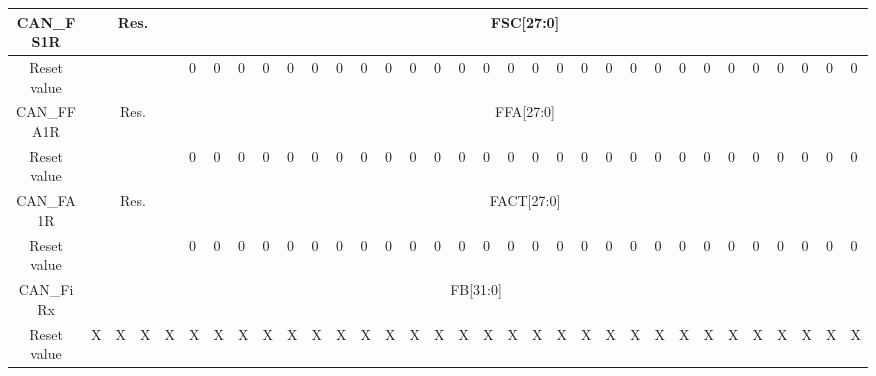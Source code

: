 \begin{table}[H]
{\begin{tabular}{|c|c|l|l|l|l|l|l|l|l|l|l|l|l|l|l|l|l|l|l|l|l|l|l|l|l|l|l|l|l|l|l|l|}
		\hline
		CAN\_FS1R & \multicolumn{4}{c|}{Res.} & \multicolumn{28}{c|}{FSC[27:0]} \\
		\hline
		Reset value & & & & & 0 & 0 & 0 & 0 & 0 & 0 & 0 & 0 & 0 & 0 & 0 & 0 & 0 & 0 & 0 & 0 & 0 & 0 & 0 & 0 & 0 & 0 & 0 & 0 & 0 & 0 & 0 & 0 \\
		\hline
		CAN\_FFA1R & \multicolumn{4}{c|}{Res.} & \multicolumn{28}{c|}{FFA[27:0]} \\
		\hline
		Reset value & & & & & 0 & 0 & 0 & 0 & 0 & 0 & 0 & 0 & 0 & 0 & 0 & 0 & 0 & 0 & 0 & 0 & 0 & 0 & 0 & 0 & 0 & 0 & 0 & 0 & 0 & 0 & 0 & 0 \\
		\hline
		CAN\_FA1R & \multicolumn{4}{c|}{Res.} & \multicolumn{28}{c|}{FACT[27:0]} \\
		\hline
		Reset value & & & & & 0 & 0 & 0 & 0 & 0 & 0 & 0 & 0 & 0 & 0 & 0 & 0 & 0 & 0 & 0 & 0 & 0 & 0 & 0 & 0 & 0 & 0 & 0 & 0 & 0 & 0 & 0 & 0 \\
		\hline
		CAN\_FiRx & \multicolumn{32}{c|}{FB[31:0]} \\
		\hline
		Reset value & X & X & X & X & X & X & X & X & X & X & X & X & X & X & X & X & X & X & X & X & X & X & X & X & X & X & X & X & X & X & X & X \\
		\hline
	\end{tabular}%
	}
	\label{Tab:l471_can_register_map}
\end{table}